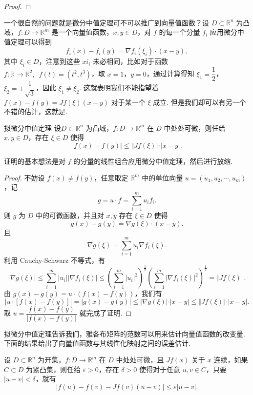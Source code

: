 \begin{proof}

\end{proof}

一个很自然的问题就是微分中值定理可不可以推广到向量值函数？设 $D\subset \mathbb{R}^n$ 为凸域，$f: D\to \mathbb{R}^m$ 是一个向量值函数，$x, y\in D$，对 $f$ 的每一个分量 $f_i$ 应用微分中值定理可以得到\[f_i(x) - f_i(y) = \nabla f_i(\xi_i)\cdot(x-y),\]其中 $\xi_i\in D$，注意到这些 $xi_i$ 未必相同，比如对于函数 $f: \mathbb{R}\to\mathbb{R}^2,\enspace f(t) = (t^2, t^3)$，取 $x = 1$，$y = 0$，通过计算得知 $\xi_1 = \dfrac{1}{2}$，$\xi_2 = \pm\dfrac{1}{\sqrt{3}}$，因此 $\xi_1 \neq \xi_2$. 这就表明我们不能指望着 $f(x) - f(y) = Jf(\xi)(x-y)$ 对于某一个 $\xi$ 成立. 但是我们却可以有另一个不错的估计，这就是.

\begin{theorem}{拟微分中值定理}{}
    设$D\subset \mathbb{R}^n$ 为凸域，$f: D\to \mathbb{R}^m$ 在 $D$ 中处处可微，则任给 $x, y\in D$，存在 $\xi\in D$ 使得\[\vert f(x) - f(y)\vert \leqslant \Vert Jf(\xi)\Vert\cdot \vert x - y\vert.\]
\end{theorem}

证明的基本想法是对 $f$ 的分量的线性组合应用微分中值定理，然后进行放缩.

\begin{proof}
    不妨设 $f(x) \neq f(y)$，任意取定 $\mathbb{R}^m$ 中的单位向量 $u = (u_1, u_2, \cdots, u_m)$，记\[g = u\cdot f = \sum_{i = 1}^{m}u_if_i.\]
    则 $g$ 为 $D$ 中的可微函数，并且对 $x, y$ 存在 $\xi\in D$ 使得 \[g(x) - g(y) = \nabla g(\xi)\cdot (x - y).\]
    且 \[\nabla g(\xi) = \sum_{i = 1}^{m}u_i\nabla f_i(\xi).\]
    利用 Cauchy-Schwarz 不等式，有 \[\vert \nabla g(\xi)\vert \leqslant \sum_{i = 1}^m\vert u_i\vert \vert \nabla f_i(\xi)\vert \leqslant \left(\sum_{i = 1}^m\vert u_i\vert^2\right)^{\frac{1}{2}}\left(\sum_{i = 1}^m\vert \nabla f_i(\xi)\vert^2\right)^{\frac{1}{2}} = \Vert Jf(\xi)\Vert.\]
    由 $g(x) - g(y) = u\cdot (f(x) - f(y))$，我们有 \[\vert u \cdot [f(x) - f(y)]\vert = \vert g(x) - g(y) \vert \leqslant \vert \nabla g(\xi)\vert \cdot \vert x - y\vert \leqslant \Vert Jf(\xi)\Vert\cdot \vert x - y\vert.\]
    取 $u = \dfrac{f(x) - f(y)}{\vert f(x) - f(y)\vert}$ 就完成了证明.
\end{proof}

拟微分中值定理告诉我们，雅各布矩阵的范数可以用来估计向量值函数的改变量. 下面的结果给出了向量值函数与其线性化映射之间的误差估计.

\begin{corollary}{}{}
    设 $D\subset \mathbb{R}^n$ 为开集，$f: D\to \mathbb{R}^m$ 在 $D$ 中处处可微，且 $Jf(x)$ 关于 $x$ 连续，如果 $C\subset D$ 为紧凸集，则任给 $\varepsilon>0$，存在 $\delta>0$ 使得对于任意 $u, v\in C$，只要 $\vert u-v\vert < \delta$，就有\[\vert f(u) - f(v) - Jf(v)(u-v)\vert\leqslant \varepsilon\vert u-v\vert.\]
\end{corollary}

